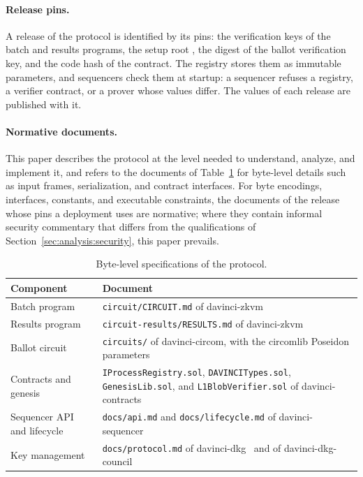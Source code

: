 \paragraph{Release pins.} A release of the protocol is identified by its pins: the verification keys of the batch and results programs, the setup root \rootc, the digest \ballotvkhash of the ballot verification key, and the code hash of the \ziskverifier contract. The registry stores them as immutable parameters, and sequencers check them at startup: a sequencer refuses a registry, a verifier contract, or a prover whose values differ. The values of each release are published with it.

\paragraph{Normative documents.} This paper describes the protocol at the level needed to understand, analyze, and implement it, and refers to the documents of Table~\ref{tab:normative} for byte-level details such as input frames, serialization, and contract interfaces. For byte encodings, interfaces, constants, and executable constraints, the documents of the release whose pins a deployment uses are normative; where they contain informal security commentary that differs from the qualifications of Section~\ref{sec:analysis:security}, this paper prevails.

\begin{table}[h]
	\centering
	\caption{Byte-level specifications of the protocol.}
	\label{tab:normative}
	\small
	\begin{tabular}{>{\raggedright\arraybackslash}p{} >{\raggedright\arraybackslash}p{}}
		\toprule
		\textbf{Component} & \textbf{Document} \\
		\midrule
		Batch program & \texttt{circuit/CIRCUIT.md} of davinci-zkvm~\cite{davinci-zkvm} \\
		Results program & \texttt{circuit-results/RESULTS.md} of davinci-zkvm \\
		Ballot circuit & \texttt{circuits/} of davinci-circom, with the circomlib Poseidon parameters~\cite{davinci-circom} \\
		Contracts and genesis & \texttt{IProcessRegistry.sol}, \texttt{DAVINCITypes.sol}, \texttt{GenesisLib.sol}, and \texttt{L1BlobVerifier.sol} of davinci-contracts~\cite{davinci-contracts} \\
		Sequencer API and lifecycle & \texttt{docs/api.md} and \texttt{docs/lifecycle.md} of davinci-sequencer~\cite{davinci-sequencer} \\
		Key management & \texttt{docs/protocol.md} of davinci-dkg~\cite{davinci-dkg} and of davinci-dkg-council~\cite{davinci-council} \\
		\bottomrule
	\end{tabular}
\end{table}

